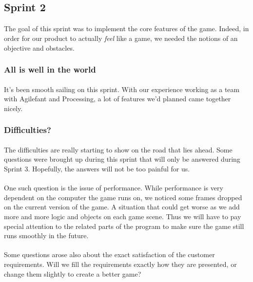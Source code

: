 \subsection{Sprint 2}

\paragraph{} The goal of this sprint was to implement the core features of the game. Indeed, in order for our product to actually \emph{feel} like a game, we needed the notions of an objective and obstacles.

\subsubsection{All is well in the world}

\paragraph{} It's been smooth sailing on this sprint. With our experience working as a team with Agilefant and Processing, a lot of features we'd planned came together nicely.

\subsubsection{Difficulties?}

\paragraph{} The difficulties are really starting to show on the road that lies ahead. Some questions were brought up during this sprint that will only be answered during Sprint 3. Hopefully, the answers will not be too painful for us.

\paragraph{} One such question is the issue of performance. While performance is very dependent on the computer the game runs on, we noticed some frames dropped on the current version of the game. A situation that could get worse as we add more and more logic and objects on each game scene. Thus we will have to pay special attention to the related parts of the program to make sure the game still runs smoothly in the future.

\paragraph{} Some questions arose also about the exact satisfaction of the customer requirements. Will we fill the requirements exactly how they are presented, or change them slightly to create a better game?

